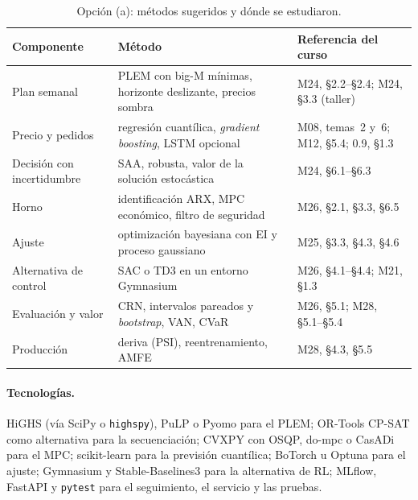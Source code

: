\begin{table}[H]
\centering\small
\caption{Opción (a): métodos sugeridos y dónde se estudiaron.}\label{tab:metodos-a}
\begin{tabularx}{\textwidth}{@{}>{\raggedright\arraybackslash}p{3.6cm}>{\raggedright\arraybackslash}X>{\raggedright\arraybackslash}p{3.8cm}@{}}
\toprule
Componente & Método & Referencia del curso \\
\midrule
Plan semanal & PLEM con big-M mínimas, horizonte deslizante, precios sombra & M24, §2.2--§2.4; M24, §3.3 (taller) \\
Precio y pedidos & regresión cuantílica, \emph{gradient boosting}, LSTM opcional & M08, temas~2 y~6; M12, §5.4; 0.9, §1.3 \\
Decisión con incertidumbre & SAA, robusta, valor de la solución estocástica & M24, §6.1--§6.3 \\
Horno & identificación ARX, MPC económico, filtro de seguridad & M26, §2.1, §3.3, §6.5 \\
Ajuste & optimización bayesiana con EI y proceso gaussiano & M25, §3.3, §4.3, §4.6 \\
Alternativa de control & SAC o TD3 en un entorno Gymnasium & M26, §4.1--§4.4; M21, §1.3 \\
Evaluación y valor & CRN, intervalos pareados y \emph{bootstrap}, VAN, CVaR & M26, §5.1; M28, §5.1--§5.4 \\
Producción & deriva (PSI), reentrenamiento, AMFE & M28, §4.3, §5.5 \\
\bottomrule
\end{tabularx}
\end{table}

\paragraph{Tecnologías.} HiGHS (vía SciPy o \texttt{highspy}), PuLP o Pyomo para el PLEM; OR-Tools CP-SAT como alternativa para la secuenciación; CVXPY con OSQP, do-mpc o CasADi para el MPC; scikit-learn para la previsión cuantílica; BoTorch u Optuna para el ajuste; Gymnasium y Stable-Baselines3 para la alternativa de RL; MLflow, FastAPI y \texttt{pytest} para el seguimiento, el servicio y las pruebas.

